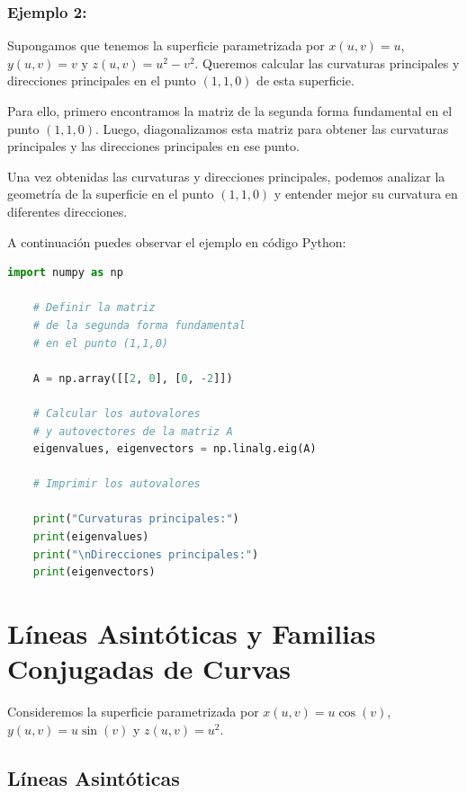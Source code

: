 \documentclass{article}
\begin{document}
	
	
	
	
\subsubsection{Ejemplo 2:}

Supongamos que tenemos la superficie parametrizada por $x(u,v) = u$, $y(u,v) = v$ y $z(u,v) = u^2 - v^2$. Queremos calcular las curvaturas principales y direcciones principales en el punto $(1,1,0)$ de esta superficie.

Para ello, primero encontramos la matriz de la segunda forma fundamental en el punto $(1,1,0)$. Luego, diagonalizamos esta matriz para obtener las curvaturas principales y las direcciones principales en ese punto.

Una vez obtenidas las curvaturas y direcciones principales, podemos analizar la geometría de la superficie en el punto $(1,1,0)$ y entender mejor su curvatura en diferentes direcciones.

A continuación puedes observar el ejemplo en código Python:

\begin{lstlisting}[language=Python, caption={Código Python para calcular autovalores y autovectores}]
	import numpy as np
	
	# Definir la matriz
	# de la segunda forma fundamental
	# en el punto (1,1,0)
		
	A = np.array([[2, 0], [0, -2]])  
	
	# Calcular los autovalores
	# y autovectores de la matriz A
	eigenvalues, eigenvectors = np.linalg.eig(A)
	
	# Imprimir los autovalores
	
	print("Curvaturas principales:")
	print(eigenvalues)
	print("\nDirecciones principales:")
	print(eigenvectors)
\end{lstlisting}





	
	\section{Líneas Asintóticas y Familias Conjugadas de Curvas}
	
	Consideremos la superficie parametrizada por $x(u, v) = u\cos(v)$, $y(u, v) = u\sin(v)$ y $z(u, v) = u^2$.
	
	\subsection{Líneas Asintóticas}
	
\end{document}
